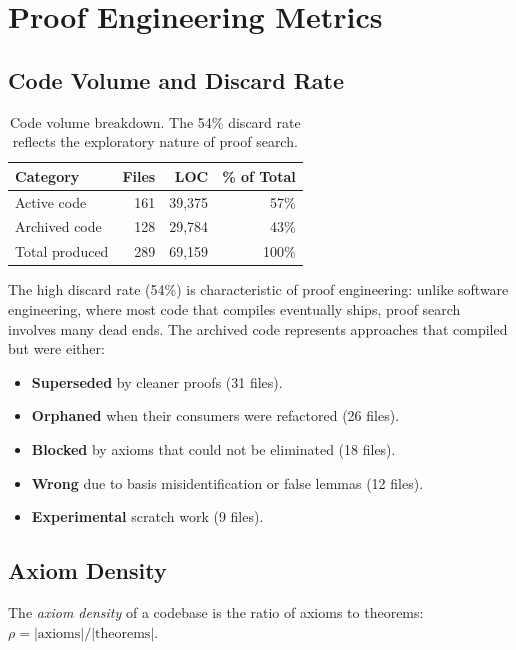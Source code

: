\documentclass[11pt,a4paper]{article}
\begin{document}
\section{Proof Engineering Metrics}
\label{sec:metrics}

\subsection{Code Volume and Discard Rate}

\begin{table}[h]
\centering
\begin{tabular}{@{}lrrr@{}}
\toprule
\textbf{Category} & \textbf{Files} & \textbf{LOC} & \textbf{\% of Total} \\
\midrule
Active code & 161 & 39,375 & 57\% \\
Archived code & 128 & 29,784 & 43\% \\
\midrule
Total produced & 289 & 69,159 & 100\% \\
\bottomrule
\end{tabular}
\caption{Code volume breakdown. The 54\% discard rate reflects the
exploratory nature of proof search.}
\label{tab:volume}
\end{table}

The high discard rate (54\%) is characteristic of proof engineering:
unlike software engineering, where most code that compiles eventually
ships, proof search involves many dead ends. The archived code
represents approaches that compiled but were either:

\begin{itemize}
  \item \textbf{Superseded} by cleaner proofs (31 files).
  \item \textbf{Orphaned} when their consumers were refactored (26 files).
  \item \textbf{Blocked} by axioms that could not be eliminated (18 files).
  \item \textbf{Wrong} due to basis misidentification or false lemmas (12 files).
  \item \textbf{Experimental} scratch work (9 files).
\end{itemize}

\subsection{Axiom Density}

\begin{definition}
The \emph{axiom density} of a codebase is the ratio of axioms to
theorems: $\rho = |\text{axioms}| / |\text{theorems}|$.
\end{definition}
\end{document}
